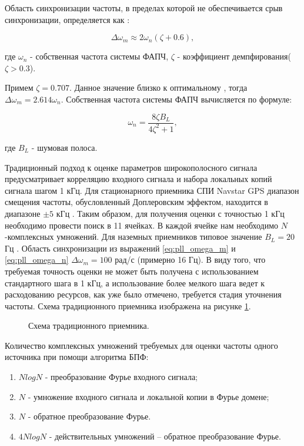 Область синхронизации частоты, в пределах которой не обеспечивается срыв синхронизации, определяется как \cite{spilker-book}:
\begin{center}
\begin{equation}
	\label{eq:pll_omega_m}
	\Delta \omega_m \approx 2 \omega_n (\zeta+0.6),
\end{equation}
\end{center}
где ${\omega_n}$ - собственная частота системы ФАПЧ, ${\zeta}$ - коэффициент демпфирования(${\zeta > 0.3}$).

Примем ${\zeta = 0.707}$. Данное значение   близко к оптимальному \cite{tsui, spilker-book}, тогда ${\Delta \omega_m = 2.614 \omega_n}$.
Собственная частота системы ФАПЧ вычисляется по формуле:
\begin{center}
\begin{equation}
	\label{eq:pll_omega_n}
	\omega_n = \frac{8 \zeta B_L}{4 \zeta^2 + 1},
\end{equation}
\end{center}
где ${B_L}$ - шумовая полоса.

Традиционный подход к оценке параметров широкополосного сигнала предусматривает корреляцию входного сигнала и набора локальных копий сигнала шагом 1 кГц.
Для стационарного приемника СПИ Navstar GPS диапазон смещения частоты, обусловленный Доплеровским эффектом, находится в диапазоне ${\pm 5}$ кГц \cite{tsui, shahtarin_sync}.
Таким образом, для получения оценки с точностью 1 кГц необходимо провести поиск в 11 ячейках. В каждой ячейке нам необходимо ${N}$-комплексных умножений.
Для наземных приемников типовое значение ${B_L=20}$ Гц \cite{tsui}. Область синхронизации из выражений \ref{eq:pll_omega_m} и \ref{eq:pll_omega_n}
${\Delta \omega_m = 100}$ рад/с (примерно 16 Гц). В виду того, что требуемая точность оценки не может быть получена с использованием стандартного шага в 1 кГц,
а использование более мелкого шага ведет к расходованию ресурсов, как уже было отмечено, требуется стадия уточнения частоты.
Схема традиционного приемника изображена на рисунке \ref{pic:corr_scheme}.
\begin{figure}[h]
	\center{}
	\caption{Схема традиционного приемника.}
	\label{pic:corr_scheme}
\end{figure}

Количество комплексных умножений требуемых для оценки частоты одного источника при помощи алгоритма БПФ:
\begin{enumerate}
\item ${NlogN}$ - преобразование Фурье входного сигнала;
\item ${N}$ - умножение входного сигнала и локальной копии в Фурье домене;
\item ${N}$ - обратное преобразование Фурье.
\item ${4NlogN}$ - действительных умножений – обратное преобразование Фурье. 
\end{enumerate}

